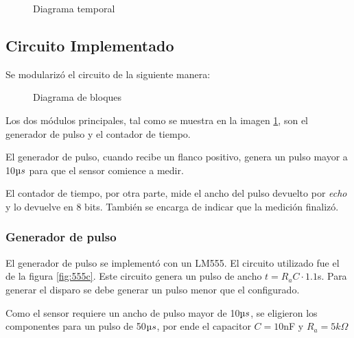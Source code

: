\documentclass[../../e3_tp2_main.tex]{subfiles}
\begin{document}
\begin{figure}[H]	
	\centering
	\caption{Diagrama temporal}
\end{figure}

\subsection{Circuito Implementado}

Se modularizó el circuito de la siguiente manera:
\begin{figure}[H]	
	\centering
	\caption{Diagrama de bloques}
	\label{fig:dBloques}
\end{figure}
Los dos módulos principales, tal como se muestra en la imagen \ref{fig:dBloques}, son el generador de pulso y el contador de tiempo.
\par El generador de pulso, cuando recibe un flanco positivo, genera un pulso mayor a 10$\micro s$ para que el sensor comience a medir.
\par El contador de tiempo, por otra parte, mide el ancho del pulso devuelto por \textit{echo} y lo devuelve en 8 bits. También se encarga de indicar que la medición finaliz\'o.

\subsubsection{Generador de pulso}
El generador de pulso se implementó con un LM555. El circuito utilizado fue el de la figura \ref{fig:555c}. Este circuito genera un pulso de ancho $t=R_a C \cdot1.1$s. Para generar el disparo se debe generar un pulso menor que el configurado.
\par Como el sensor requiere un ancho de pulso mayor de 10$\micro s$, se eligieron los componentes para un pulso de 50$\micro s$, por ende el capacitor $C=10$nF y $R_a=5k \Omega$
\end{document}
